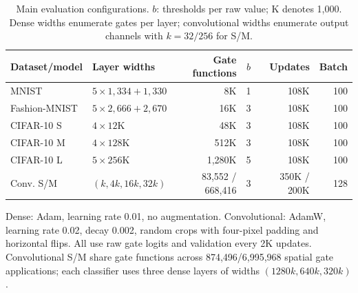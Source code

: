 \begin{table}[t]
\centering
\caption{Main evaluation configurations. $b$: thresholds per raw value; K denotes 1,000. Dense widths enumerate gates per layer; convolutional widths enumerate output channels with $k=32/256$ for S/M.}
\label{tab:protocol}
\tabfont
\setlength{\tabcolsep}{4pt}
\begin{tabular}{@{}llrcrr@{}}
\toprule
Dataset/model & Layer widths & Gate functions & $b$ & Updates & Batch \\
\midrule
MNIST & $5\times1{,}334+1{,}330$ & 8K & 1 & 108K & 100 \\
Fashion-MNIST & $5\times2{,}666+2{,}670$ & 16K & 3 & 108K & 100 \\
CIFAR-10 S & $4\times12$K & 48K & 3 & 108K & 100 \\
CIFAR-10 M & $4\times128$K & 512K & 3 & 108K & 100 \\
CIFAR-10 L & $5\times256$K & 1,280K & 5 & 108K & 100 \\
Conv. S/M & $(k,4k,16k,32k)$ & 83,552 / 668,416 & 3 & 350K / 200K & 128 \\
\bottomrule
\end{tabular}
\par\smallskip
\begin{minipage}{\textwidth}\normalsize Dense: Adam, learning rate 0.01, no augmentation. Convolutional: AdamW, learning rate 0.02, decay 0.002, random crops with four-pixel padding and horizontal flips. All use raw gate logits and validation every 2K updates. Convolutional S/M share gate functions across 874,496/6,995,968 spatial gate applications; each classifier uses three dense layers of widths $(1280k,640k,320k)$.\end{minipage}
\end{table}
